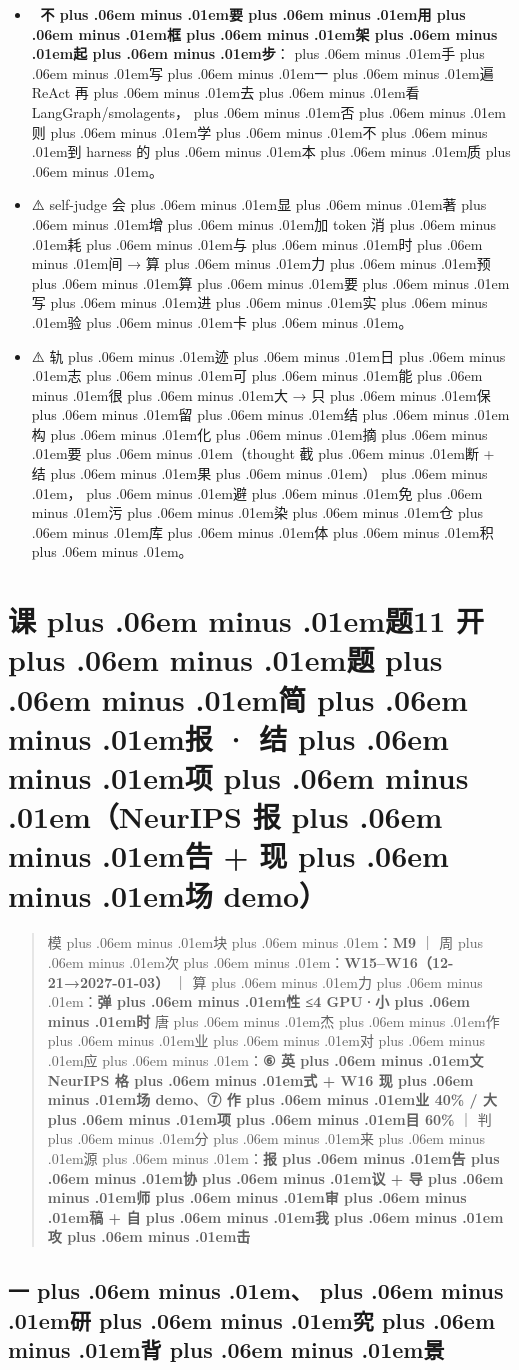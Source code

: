\documentclass[
]{article}
\providecommand{\tightlist}{%
  \setlength{\itemsep}{0pt}\setlength{\parskip}{0pt}}
\def\zh#1{{\zhfont #1}}
\def\sym#1{{\symfont #1}}
\def\emo#1{{\emofont #1}}
\def\zhglue{\hskip0pt plus .06em minus .01em}
\begin{document}
\begin{itemize}
\tightlist
\item
  \emo{🚨} \textbf{\zh{不\zhglue 要\zhglue 用\zhglue 框\zhglue 架\zhglue 起\zhglue 步}}\zh{：\zhglue 手\zhglue 写\zhglue 一\zhglue 遍} ReAct \zh{再\zhglue 去\zhglue 看} LangGraph/smolagents\zh{，\zhglue 否\zhglue 则\zhglue 学\zhglue 不\zhglue 到} harness \zh{的\zhglue 本\zhglue 质\zhglue 。}
\item
  \sym{⚠️} self-judge \zh{会\zhglue 显\zhglue 著\zhglue 增\zhglue 加} token \zh{消\zhglue 耗\zhglue 与\zhglue 时\zhglue 间} \sym{→} \zh{算\zhglue 力\zhglue 预\zhglue 算\zhglue 要\zhglue 写\zhglue 进\zhglue 实\zhglue 验\zhglue 卡\zhglue 。}
\item
  \sym{⚠️} \zh{轨\zhglue 迹\zhglue 日\zhglue 志\zhglue 可\zhglue 能\zhglue 很\zhglue 大} \sym{→} \zh{只\zhglue 保\zhglue 留\zhglue 结\zhglue 构\zhglue 化\zhglue 摘\zhglue 要\zhglue （}thought \zh{截\zhglue 断} + \zh{结\zhglue 果\zhglue ）\zhglue ，\zhglue 避\zhglue 免\zhglue 污\zhglue 染\zhglue 仓\zhglue 库\zhglue 体\zhglue 积\zhglue 。}
\end{itemize}

\newpage

\section{\zh{课\zhglue 题}11 \zh{开\zhglue 题\zhglue 简\zhglue 报} \sym{·} \zh{结\zhglue 项\zhglue （}NeurIPS \zh{报\zhglue 告} + \zh{现\zhglue 场} demo\zh{）}}\label{ux8bfeux989811-ux5f00ux9898ux7b80ux62a5-ux7ed3ux9879neurips-ux62a5ux544a-ux73b0ux573a-demo}

\begin{quote}
\zh{模\zhglue 块\zhglue ：}\textbf{M9} \zh{｜} \zh{周\zhglue 次\zhglue ：}\textbf{W15--W16\zh{（}12-21\sym{→}2027-01-03\zh{）}} \zh{｜} \zh{算\zhglue 力\zhglue ：}\textbf{\zh{弹\zhglue 性} \sym{≤}4 GPU\sym{·}\zh{小\zhglue 时}} \zh{唐\zhglue 杰\zhglue 作\zhglue 业\zhglue 对\zhglue 应\zhglue ：}\textbf{\sym{⑥} \zh{英\zhglue 文} NeurIPS \zh{格\zhglue 式} + W16 \zh{现\zhglue 场} demo}\zh{、}\textbf{\sym{⑦} \zh{作\zhglue 业} 40\% / \zh{大\zhglue 项\zhglue 目} 60\%} \zh{｜} \zh{判\zhglue 分\zhglue 来\zhglue 源\zhglue ：}\textbf{\zh{报\zhglue 告\zhglue 协\zhglue 议} + \zh{导\zhglue 师\zhglue 审\zhglue 稿} + \zh{自\zhglue 我\zhglue 攻\zhglue 击}}
\end{quote}

\subsection{\zh{一\zhglue 、\zhglue 研\zhglue 究\zhglue 背\zhglue 景}}\label{ux4e00ux7814ux7a76ux80ccux666f-9}
\end{document}
